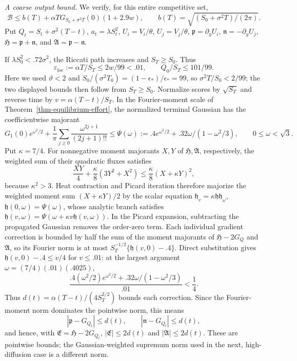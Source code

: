 \documentclass[mnsc]{informs3}
\begin{document}
\begin{APPENDICES}
{\emph{A coarse output bound.}
We verify, for this entire competitive set,
\begin{equation}\label{eq-design-competitive-output-screen}
\mathcal B\leq b(T)+\alpha T G_{S_0+\sigma^2T}(0)(1+2.9w),
\qquad b(T)=\sqrt{(S_0+\sigma^2T)/(2\pi)}.
\end{equation}
Put $Q_t=S_t+\sigma^2(T-t)$, $a_t=\lambda S_t^2$,
$U_i=V_i/\theta$, $U_j=V_j/\theta$, ${\mathfrak p}=\partial_yU_i$, ${\mathfrak n}=-\partial_yU_j$,
${\mathfrak H}={\mathfrak p}+{\mathfrak n}$, and ${\mathfrak A}={\mathfrak p}-{\mathfrak n}$.

If $\lambda S_0^2<.72\sigma^2$, the Riccati path increases and
$S_T\geq S_0$. Thus
\[
\varepsilon_{\mathrm{loc}}:=\alpha T/S_T\leq2w/99<.01,\qquad Q_0/S_T\leq101/99.
\]
Here we used ${\vartheta}<2$ and
$S_0/(\sigma^2T_0)=(1-{\epsilon_*})/{\epsilon_*}=99$, so
$\sigma^2T/S_0<2/99$; the two displayed bounds then follow from
$S_T\geq S_0$.
Normalize scores by $\sqrt{S_T}$ and reverse time by
$v=\alpha(T-t)/S_T$. In the Fourier-moment scale of
Theorem~\ref{thm-equilibrium-effort}, the normalized terminal Gaussian
has the coefficientwise majorant
\[
G_1(0)e^{{\omega}^2/2}+\frac1\pi\sum_{j\geq0}
\frac{{\omega}^{2j+1}}{(2j+1)!!}
\leq\Psi({\omega}):=.4e^{{\omega}^2/2}+.32{\omega}/(1-{\omega}^2/3),\qquad 0\leq {\omega}<\sqrt3.
\]
Put $\kappa=7/4$. For nonnegative moment majorants $X,Y$ of ${\mathfrak H},{\mathfrak A}$,
respectively, the weighted sum of their quadratic fluxes satisfies
\[
\frac{XY}{4}+\frac\kappa8(3Y^2+X^2)
\leq\frac\kappa8(X+\kappa Y)^2,
\]
because $\kappa^2>3$.
Heat contraction and Picard iteration therefore majorize
the weighted moment sum $(X+\kappa Y)/2$ by the scalar equation
${\mathfrak h}_v=\kappa {\mathfrak h} {\mathfrak h}_{\omega}$, ${\mathfrak h}(0,{\omega})=\Psi({\omega})$, whose analytic branch satisfies
${\mathfrak h}(v,{\omega})=\Psi({\omega}+\kappa v{\mathfrak h}(v,{\omega}))$.
In the Picard expansion, subtracting the propagated Gaussian removes
the order-zero term. Each individual gradient correction is bounded
by half the sum of the moment majorants of ${\mathfrak H}-2G_Q$ and ${\mathfrak A}$,
so its Fourier norm is at most
$S_T^{-1/2}\{{\mathfrak h}(v,0)-.4\}$.
Direct substitution gives ${\mathfrak h}(v,0)-.4\leq v/4$ for $v\leq.01$:
at the largest argument ${\omega}=(7/4)(.01)(.4025)$,
\[
\frac{.4({\omega}^2/2)e^{{\omega}^2/2}+.32{\omega}/(1-{\omega}^2/3)}{.01}<\frac14.
\]
Thus $d(t)=\alpha(T-t)/(4S_T^{3/2})$ bounds each correction.
Since the Fourier-moment norm dominates the pointwise norm, this means
\[
|{\mathfrak p}-G_{Q_t}|\leq d(t),\qquad |{\mathfrak n}-G_{Q_t}|\leq d(t),
\]
and hence, with ${\mathfrak E}={\mathfrak H}-2G_{Q_t}$, $|{\mathfrak E}|\leq2d(t)$ and
$|{\mathfrak A}|\leq2d(t)$. These are pointwise bounds; the Gaussian-weighted
supremum norm used in the next, high-diffusion case is a different norm.

}
\end{APPENDICES}
\end{document}
